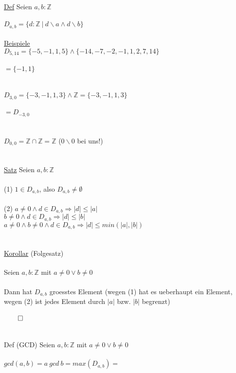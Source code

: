 \documentclass[18pt,a4paper]{article}
\newcommand{\tab}{\hspace*{2em}}
\begin{document}
\uline{Def} Seien $a,b : \mathbb{Z}$\\
\\
$D_{a,b} = \{ d : \mathbb{Z} \:\vert\: d\backslash a \wedge d\backslash b\}$\\
\\
\uline{Beispiele}
\\
$D_{5,14}= \{-5,-1,1,5\} \wedge \{-14,-7,-2,-1,1,2,7,14\}$\\
\\
$= \{-1,1\}$\\
\\
\\
$D_{3,0}= \{-3,-1,1,3\} \wedge \mathbb{Z} = \{-3,-1,1,3\}$\\
\\
$= D_{-3,0}$\\
\\
\\
$D_{0,0} = \mathbb{Z} \cap \mathbb{Z} = \mathbb{Z}$ \tab ($0\backslash 0$ bei uns!)\\
\\
\\
\uline{Satz} Seien $a,b : \mathbb{Z}$\\
\\
(1) $1 \in D_{a,b}$, also $D_{a,b} \neq \emptyset$\\
\\
(2) $a\neq 0 \wedge d \in D_{a,b} \Rightarrow |d| \leqslant |a|$\\
\tab $b\neq 0 \wedge d \in D_{a,b} \Rightarrow |d| \leqslant |b|$\\
\tab $a\neq 0 \wedge b\neq 0 \wedge d \in D_{a,b} \Rightarrow |d| \leqslant min(|a|,|b|)$\\
\\
\\
\uline{Korollar} (Folgesatz)\\
\\
Seien $a,b : \mathbb{Z}$ mit $a\neq 0 \vee b\neq 0$\\
\\
Dann hat $D_{a,b}$ groesstes Element (wegen (1) hat es ueberhaupt ein Element, wegen (2) ist jedes Element durch $|a|$ bzw. $|b|$ begrenzt)\\
\\
$\qed$\\
\\
\\
Def (GCD) Seien $a,b : \mathbb{Z}$ mit $a\neq 0 \vee b\neq 0$\\
\\
$gcd(a,b) = a\: gcd\: b = max(D_{a,b}) = $\\
\end{document}
